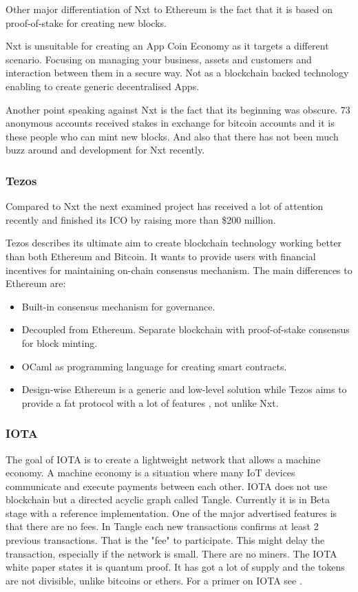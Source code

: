 Other major differentiation of Nxt to Ethereum is the fact that it is based on proof-of-stake for creating new blocks.

Nxt is unsuitable for creating an App Coin Economy as it targets a different scenario. Focusing on managing your business, assets and customers and interaction between them in a secure way. Not as a blockchain backed technology enabling to create generic decentralised Apps.

Another point speaking against Nxt is the fact that its beginning was obscure. 73 anonymous accounts received stakes in exchange for bitcoin accounts and it is these people who can mint new blocks. And also that there has not been much buzz around and development for Nxt recently.

\subsubsection{Tezos}
Compared to Nxt the next examined project has received a lot of attention recently and finished its ICO by raising more than \$200 million.

Tezos describes its ultimate aim to create blockchain technology working better than both Ethereum and Bitcoin. It wants to provide users with financial incentives for maintaining on-chain consensus mechanism. The main differences to Ethereum are:

\begin{itemize}
    \item Built-in consensus mechanism for governance.
    \item Decoupled from Ethereum. Separate blockchain with proof-of-stake consensus for block minting.
    \item OCaml as programming language for creating smart contracts.
    \item Design-wise Ethereum is a generic and low-level solution while Tezos aims to provide a fat protocol with a lot of features \cite{TezosEth}, not unlike Nxt.
\end{itemize}

\subsubsection{IOTA}
The goal of IOTA is to create a lightweight network that allows a machine economy. A machine economy is a situation where many IoT devices communicate and execute payments between each other. IOTA does not use blockchain but a directed acyclic graph called Tangle. Currently it is in Beta stage with a reference implementation. One of the major advertised features is that there are no fees. In Tangle each new transactions confirms at least 2 previous transactions. That is the "fee" to participate. This might delay the transaction, especially if the network is small. There are no miners. The IOTA white paper states it is quantum proof. It has got a lot of supply and the tokens are not divisible, unlike bitcoins or ethers. For a primer on IOTA see \cite{IOTA}.

